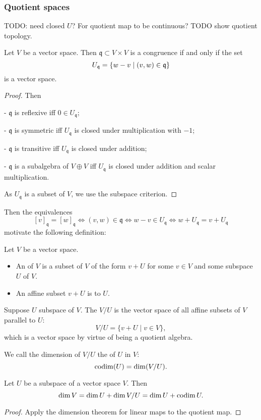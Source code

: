 \subsubsection{Quotient spaces}
TODO: need closed $U$? For quotient map to be continuous? TODO show quotient topology.

\begin{proposition}
Let $V$ be a vector space. Then $\mathfrak{q}\subset V\times V$ is a congruence \textup{if and only if} the set
\[ U_\mathfrak{q} = \left\{ w-v \;\middle|\; (v,w)\in\mathfrak{q} \right\} \]
is a vector space.
\end{proposition}
\begin{proof} Then

- $\mathfrak{q}$ is reflexive iff $0\in U_\mathfrak{q}$;

- $\mathfrak{q}$ is symmetric iff $U_\mathfrak{q}$ is closed under multiplication with $-1$;

- $\mathfrak{q}$ is transitive iff $U_\mathfrak{q}$ is closed under addition;

- $\mathfrak{q}$ is a subalgebra of $V\oplus V$ iff $U_\mathfrak{q}$ is closed under addition and scalar multiplication.

As $U_\mathfrak{q}$ is a subset of $V$, we use the subspace criterion.
\end{proof}
Then the equivalences
\[ [v]_\mathfrak{q}=[w]_\mathfrak{q} \iff (v,w)\in\mathfrak{q} \iff w-v\in U_\mathfrak{q} \iff w+U_\mathfrak{q} = v+U_\mathfrak{q} \]
motivate the following definition:
\begin{definition}
Let $V$ be a vector space.
\begin{itemize}
\item An  of $V$ is a subset of $V$ of the form $v+U$ for some $v\in V$ and some subspace $U$ of $V$.
\item An affine subset $v+U$ is  to $U$.
\end{itemize}
Suppose $U$ subspace of $V$. The  $V/U$ is the vector space of all affine subsets of $V$ parallel to $U$:
\[ V/U = \{ v+U \;|\; v\in V \}, \]
which is a vector space by virtue of being a quotient algebra.

We call the dimension of $V/U$ the  of $U$ in $V$:
\[ \operatorname{codim}(U) = \dim(V/U). \]
\end{definition}

\begin{proposition}
Let $U$ be a subspace of a vector space $V$. Then
\[ \dim V = \dim U + \dim V/U = \dim U + \operatorname{codim} U.  \]
\end{proposition}
\begin{proof}
Apply the dimension theorem for linear maps to the quotient map.
\end{proof}

